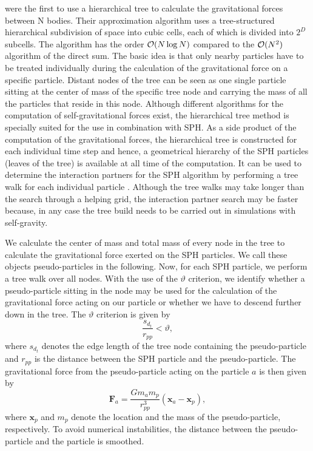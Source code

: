 \documentclass[10pt,fleqn,twoside]{article}
\newcommand{\vect}[1]{{\mathbf #1}}
\begin{document}
\cite{1986Natur.324..446B} were the first to use a hierarchical tree to calculate the gravitational forces between N
bodies. Their approximation algorithm uses a tree-structured hierarchical subdivision of space into cubic cells, each of
which is divided into $2^D$ subcells. The algorithm has the order ${\cal O}(N \log N)$ compared to the ${\cal O}(N^2)$
algorithm of the direct sum. The basic idea is that only nearby particles have to be treated individually during the
calculation of the gravitational force on a specific particle. Distant nodes of the tree can be seen as one single
particle sitting at the center of mass of the specific tree node and carrying the mass of all the particles that reside
in this node. Although different algorithms for the computation of self-gravitational forces exist, the hierarchical
tree method is specially suited for the use in combination with SPH. As a side product of the computation of the
gravitational forces, the hierarchical tree is constructed for each individual time step and hence, a geometrical hierarchy
of the SPH particles (leaves of the tree) is available at all time of the computation. It can be used to determine the
interaction partners for the SPH algorithm by performing a tree walk for each individual particle \citep{hernquist:1989}. Although the tree
walks may take longer than the search through a helping grid, the interaction partner search may be faster because, in
any case the tree build needs to be carried out in simulations with self-gravity.

We calculate the center of mass and total mass of every node in the tree to calculate the gravitational force exerted on the SPH particles. We call these objects pseudo-particles in the following. Now, for each SPH
particle, we perform a tree walk over all nodes.
With the use of the
$\vartheta$ criterion, we identify whether a pseudo-particle sitting in the node may be used for the calculation of the
gravitational force acting on our particle or whether we have to descend further down in the tree. The $\vartheta$ criterion is given by
%
\begin{equation}
 \frac{s_{d_t}}{r_{pp}} < \vartheta,
\end{equation}
%
where $s_{d_t}$ denotes the edge length of the tree node containing the pseudo-particle and $r_{pp}$ is the distance
between the SPH particle and the pseudo-particle.
The gravitational force from the pseudo-particle acting on the particle $a$ is then given by
%
\begin{equation}
 \label{eq:gravitational_force}
 \vect{F_a} = \frac{Gm_a m_p}{r_{pp}^3} \left( \vect{x_a} - \vect{x_p} \right),
\end{equation}
where $\vect{x_p}$ and $m_p$ denote the location and the mass of the pseudo-particle, respectively.
To avoid numerical instabilities, the distance between the pseudo-particle and the particle is smoothed.
\end{document}

